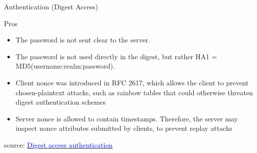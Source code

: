 \documentclass{beamer}
\begin{document}
\begin{frame}[t]{Authentication (Digest Access)}
    \scriptsize

	Pros
  \begin{itemize}
    \item<1-> The password is not sent clear to the server.
    \item<2-> The password is not used directly in the digest, but rather HA1 = MD5(username:realm:password).
    \item<3-> Client nonce was introduced in RFC 2617, which allows the client to prevent chosen-plaintext attacks, such as rainbow tables that could otherwise threaten digest authentication schemes
    \item<4-> Server nonce is allowed to contain timestamps. Therefore, the server may inspect nonce attributes submitted by clients, to prevent replay attacks
  \end{itemize}

\vspace{37mm}
\tiny source: \href{https://en.wikipedia.org/wiki/Digest_access_authentication} {\textcolor{blue}{Digest access authentication}} 	
\end{frame}
\end{document}
